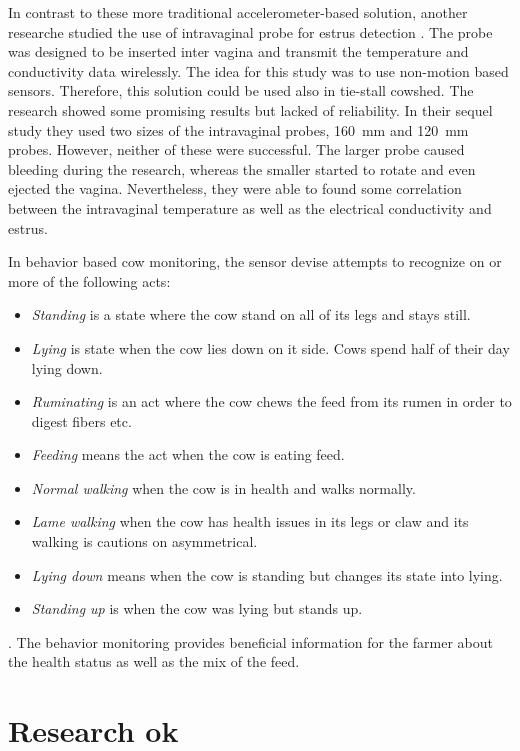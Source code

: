 \documentclass[english,12pt,a4paper,pdftex,elec,utf8]{aaltothesis}
\begin{document}
In contrast to these more traditional accelerometer-based solution,  another researche studied the use of intravaginal probe for estrus detection \cite{Andersson2016101} \cite{7370219}. The probe was designed to be inserted inter vagina and transmit the temperature and conductivity data wirelessly. The idea for this study was to use non-motion based sensors. Therefore, this solution could be used  also in tie-stall cowshed. The research showed some promising results but lacked of reliability. In their sequel study they used two sizes of the intravaginal probes, \SI{160}{\milli \metre} and \SI{120}{\milli \metre} probes. However, neither of these were successful. The larger probe caused bleeding during the research, whereas the smaller started to rotate and even ejected the vagina. Nevertheless, they were able to found some correlation between the intravaginal temperature as well as the electrical conductivity and estrus.





In behavior based cow monitoring, the sensor devise attempts to recognize on or more of the following acts:

\begin{itemize}
\item \textit{Standing} is a state where the cow stand on all of its legs and stays still.
\item \textit{Lying} is state when the cow lies down on it side. Cows spend half of their day lying down.
\item \textit{Ruminating} is an act where the cow chews the feed from its rumen in order to digest fibers etc.
\item \textit{Feeding} means the act when the cow is eating feed.
\item \textit{Normal walking} when the cow is in health and walks normally.
\item \textit{Lame walking} when the cow has health issues in its legs or claw and its walking is cautions on asymmetrical.
\item \textit{Lying down} means when the cow is standing but changes its state into lying.
\item \textit{Standing up} is when the cow was lying but stands up.
\end{itemize}. The behavior monitoring provides beneficial information for the farmer about the health status as well as the mix of the feed.


\clearpage

\section{Research ok} \label{researchsection}
\end{document}
